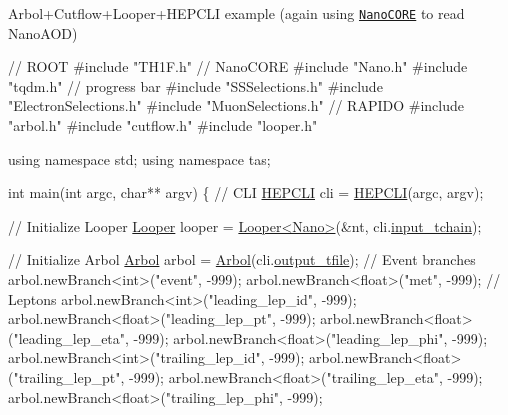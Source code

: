 \begin{DoxyEnumerate}
\item Arbol+\+Cutflow+\+Looper+\+H\+E\+P\+C\+LI example (again using \href{https://github.com/cmstas/NanoTools/tree/master/NanoCORE}{\tt Nano\+C\+O\+RE} to read Nano\+A\+OD) 
\begin{DoxyCode}
\textcolor{comment}{// ROOT}
\textcolor{preprocessor}{#include "TH1F.h"}
\textcolor{comment}{// NanoCORE}
\textcolor{preprocessor}{#include "Nano.h"}
\textcolor{preprocessor}{#include "tqdm.h"} \textcolor{comment}{// progress bar}
\textcolor{preprocessor}{#include "SSSelections.h"}
\textcolor{preprocessor}{#include "ElectronSelections.h"}
\textcolor{preprocessor}{#include "MuonSelections.h"}
\textcolor{comment}{// RAPIDO}
\textcolor{preprocessor}{#include "arbol.h"}
\textcolor{preprocessor}{#include "cutflow.h"}
\textcolor{preprocessor}{#include "looper.h"}

\textcolor{keyword}{using namespace }std;
\textcolor{keyword}{using namespace }tas;

\textcolor{keywordtype}{int} main(\textcolor{keywordtype}{int} argc, \textcolor{keywordtype}{char}** argv) 
\{
    \textcolor{comment}{// CLI}
    \hyperlink{classHEPCLI}{HEPCLI} cli = \hyperlink{classHEPCLI}{HEPCLI}(argc, argv);

    \textcolor{comment}{// Initialize Looper}
    \hyperlink{classLooper}{Looper} looper = \hyperlink{classLooper}{Looper<Nano>}(&nt, cli.\hyperlink{classHEPCLI_a3d4bb4a7c1f1b6d4e008ff76e43bef15}{input\_tchain});

    \textcolor{comment}{// Initialize Arbol}
    \hyperlink{classArbol}{Arbol} arbol = \hyperlink{classArbol}{Arbol}(cli.\hyperlink{classHEPCLI_ab900d2e3822e20d636564874440d33f0}{output\_tfile});
    \textcolor{comment}{// Event branches}
    arbol.newBranch<\textcolor{keywordtype}{int}>(\textcolor{stringliteral}{"event"}, -999);
    arbol.newBranch<\textcolor{keywordtype}{float}>(\textcolor{stringliteral}{"met"}, -999);
    \textcolor{comment}{// Leptons}
    arbol.newBranch<\textcolor{keywordtype}{int}>(\textcolor{stringliteral}{"leading\_lep\_id"}, -999);
    arbol.newBranch<\textcolor{keywordtype}{float}>(\textcolor{stringliteral}{"leading\_lep\_pt"}, -999);
    arbol.newBranch<\textcolor{keywordtype}{float}>(\textcolor{stringliteral}{"leading\_lep\_eta"}, -999);
    arbol.newBranch<\textcolor{keywordtype}{float}>(\textcolor{stringliteral}{"leading\_lep\_phi"}, -999);
    arbol.newBranch<\textcolor{keywordtype}{int}>(\textcolor{stringliteral}{"trailing\_lep\_id"}, -999);
    arbol.newBranch<\textcolor{keywordtype}{float}>(\textcolor{stringliteral}{"trailing\_lep\_pt"}, -999);
    arbol.newBranch<\textcolor{keywordtype}{float}>(\textcolor{stringliteral}{"trailing\_lep\_eta"}, -999);
    arbol.newBranch<\textcolor{keywordtype}{float}>(\textcolor{stringliteral}{"trailing\_lep\_phi"}, -999);


\end{DoxyCode}
\end{DoxyEnumerate}
